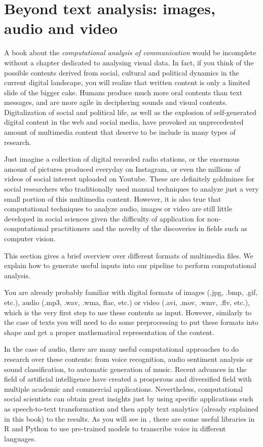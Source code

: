 \section{Beyond text analysis: images, audio and video}
\label{sec:beyond}

A book about the \textit{computational analysis of communication} would be incomplete without a chapter dedicated to analysing visual data.
In fact, if you think of the possible contents derived from social, cultural and political dynamics in the current digital landscape, you will realize that written content is only a limited slide of the bigger cake. Humans produce much more oral contents than text messages, and are more agile in deciphering sounds and visual contents. Digitalization of social and political life, as well as the explosion of self-generated digital content in the web and social media, have provoked an unprecedented amount of multimedia content that deserve to be include in many types of research.

Just imagine a collection of digital recorded radio stations, or the enormous amount of pictures produced everyday on Instagram, or even the millions of videos of social interest uploaded on Youtube. These are definitely goldmines for social researchers who traditionally used manual techniques to analyze just a very small portion of this multimedia content. However, it is also true that computational techniques to analyze audio, images or video are still little developed in social sciences given the difficulty of application for non-computational practitioners and the novelty of the discoveries in fields such as computer vision. 

This section gives a brief overview over different formats of multimedia files. We explain how to generate useful inputs into our pipeline to perform computational analysis.

You are already probably familiar with digital formats of images (.jpg, .bmp, .gif, etc.), audio (.mp3, .wav, .wma, flac, etc.) or video (.avi, .mov, .wmv, .flv, etc.), which is the very first step to use these contents as input. However, similarly to the case of texts you will need to do some preprocessing to put these formats into shape and get a proper mathematical representation of the content. 

In the case of audio, there are many useful computational approaches to do research over these contents: from voice recognition, audio sentiment analysis or sound classification, to automatic generation of music. Recent advances in the field of artificial intelligence have created a prosperous and diversified field with multiple academic and commercial applications. Nevertheless, computational social scientists can obtain great insights just by using specific applications such as speech-to-text transformation and then apply text analytics (already explained in this book) to the results. As you will see in , there are some useful libraries in R and Python to use pre-trained models to transcribe voice in different languages. 

